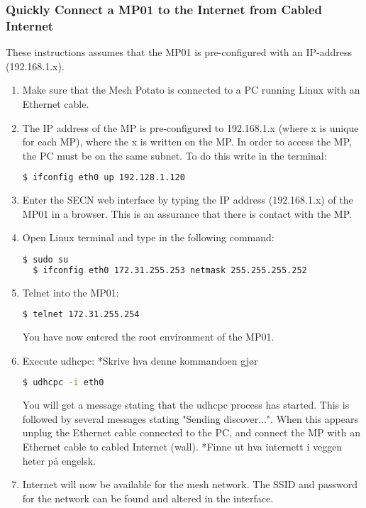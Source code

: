 \subsubsection{Quickly Connect a MP01 to the Internet from Cabled Internet}

These instructions assumes that the MP01 is pre-configured with an IP-address (192.168.1.x). 

\begin{enumerate}
\item Make sure that the Mesh Potato is connected to a PC running Linux with an Ethernet cable. 
\item The IP address of the MP is pre-configured to 192.168.1.x (where x is unique for each MP), where the x is written on the MP. In order to access the MP, the PC must be on the same subnet. To do this write in the terminal: 
\noindent
\begin{lstlisting}[language=bash]
  $ ifconfig eth0 up 192.128.1.120
\end{lstlisting}
\item Enter the SECN web interface by typing the IP address (192.168.1.x) of the MP01 in a browser. This is an assurance that there is contact with the MP. 
\item Open Linux terminal and type in the following command: 
\noindent
\begin{lstlisting}[language=bash]
  $ sudo su
  $ ifconfig eth0 172.31.255.253 netmask 255.255.255.252 
\end{lstlisting}
\item Telnet into the MP01:
\noindent
\begin{lstlisting}[language=bash]
  $ telnet 172.31.255.254 
\end{lstlisting}
You have now entered the root environment of the MP01. 
\item Execute udhcpc: 
*Skrive hva denne kommandoen gjør
\noindent
\begin{lstlisting}[language=bash]
  $ udhcpc -i eth0 
\end{lstlisting}
You will get a message stating that the udhcpc process has started. This is followed by several messages stating "Sending discover...". When this appears unplug the Ethernet cable connected to the PC, and connect the MP with an Ethernet cable to cabled Internet (wall). 
*Finne ut hva internett i veggen heter på engelsk.
\item Internet will now be available for the mesh network. The SSID and password for the network can be found and altered in the interface. 
\end{enumerate}

